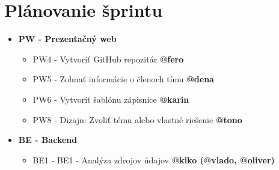 \documentclass{article}
\begin{document}
    \section*{Plánovanie šprintu}

    \begin{itemize}
    \item \textbf {PW - Prezentačný web} 
        \begin{itemize}
            \item PW4 - Vytvoriť GitHub repozitár \textbf {@fero}
            \item PW5 - Zohnať informácie o členoch tímu \textbf {@dena}
            \item PW6 - Vytvoriť šablónu zápisnice \textbf {@karin}
            \item PW8 - Dizajn: Zvoliť tému alebo vlastné riešenie \textbf {@tono}   
        \end{itemize}
    \item \textbf {BE - Backend} 
        \begin{itemize}
            \item BE1 - BE1 - Analýza zdrojov údajov \textbf {@kiko (@vlado, @oliver)}
        \end{itemize}        
    \end{itemize}
\end{document}
